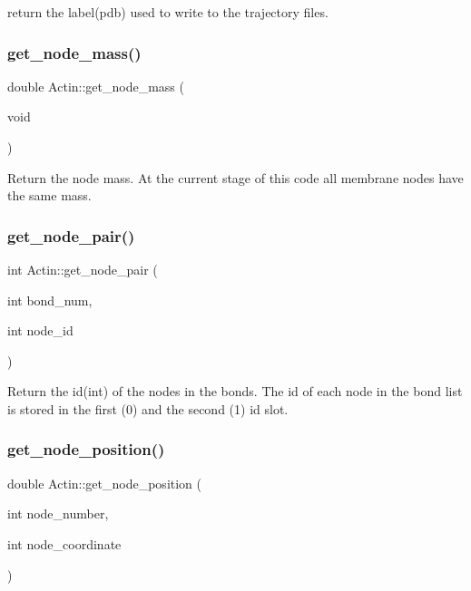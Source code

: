 return the label(pdb) used to write to the trajectory files. \mbox{\label{classActin_a012b67bcc55e02a460dbd4d4b6cd8ea7}} 
\subsubsection{\texorpdfstring{get\_node\_mass()}{get\_node\_mass()}}
{\footnotesize\ttfamily double Actin\+::get\+\_\+node\+\_\+mass (\begin{DoxyParamCaption}\item[{void}]{ }\end{DoxyParamCaption})\hspace{0.3cm}{\ttfamily [inline]}}

Return the node mass. At the current stage of this code all membrane nodes have the same mass. \mbox{\label{classActin_abd9b6ba0cc9f5aa8e670c314ae8afa8e}} 
\subsubsection{\texorpdfstring{get\_node\_pair()}{get\_node\_pair()}}
{\footnotesize\ttfamily int Actin\+::get\+\_\+node\+\_\+pair (\begin{DoxyParamCaption}\item[{int}]{bond\+\_\+num,  }\item[{int}]{node\+\_\+id }\end{DoxyParamCaption})\hspace{0.3cm}{\ttfamily [inline]}}

Return the id(int) of the nodes in the bonds. The id of each node in the bond list is stored in the first (0) and the second (1) id slot. \mbox{\label{classActin_a833dc614b33e4196ce9202f10e556e36}} 
\subsubsection{\texorpdfstring{get\_node\_position()}{get\_node\_position()}}
{\footnotesize\ttfamily double Actin\+::get\+\_\+node\+\_\+position (\begin{DoxyParamCaption}\item[{int}]{node\+\_\+number,  }\item[{int}]{node\+\_\+coordinate }\end{DoxyParamCaption})\hspace{0.3cm}{\ttfamily [inline]}}

